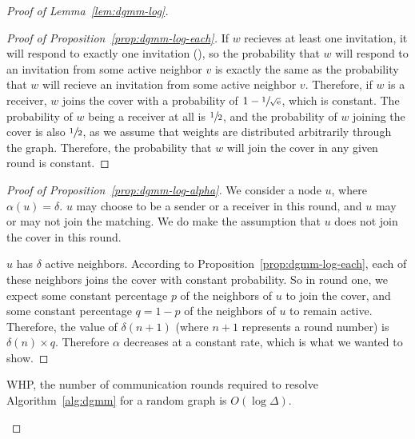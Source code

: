 \begin{proof}[Proof of Lemma~\ref{lem:dgmm-log}]
\begin{proof}[Proof of Proposition~\ref{prop:dgmm-log-each}]
If $w$ recieves at least one invitation, it will respond to exactly one invitation (), so the probability that $w$ will respond to an invitation from some active neighbor $v$ is exactly the same as the probability that $w$ will recieve an invitation from some active neighbor $v$. Therefore, if $w$ is a receiver, $w$ joins the cover with a probability of $1 - \sfrac{1}{\sqrt{{\mathrm{e}}}}$, which is constant. The probability of $w$ being a receiver at all is $\sfrac{1}{2}$, and the probability of $w$ joining the cover is also $\sfrac{1}{2}$, as we assume that weights are distributed arbitrarily through the graph. Therefore, the probability that $w$ will join the cover in any given round is constant.
\end{proof}

\begin{proof}[Proof of Proposition~\ref{prop:dgmm-log-alpha}]

We consider a node $u$, where $\alpha(u) = \delta$. $u$ may choose to be a sender or a receiver in this round, and $u$ may or may not join the matching. We do make the assumption that $u$ does not join the cover in this round.

$u$ has $\delta$ active neighbors. According to Proposition~\ref{prop:dgmm-log-each}, each of these neighbors joins the cover with constant probability. So in round one, we expect some constant percentage $p$ of the neighbors of $u$ to join the cover, and some constant percentage $q = 1-p$ of the neighbors of $u$ to remain active. Therefore, the value of $\delta(n+1)$ (where $n+1$ represents a round number) is $\delta(n) \times q$. Therefore $\alpha$ decreases at a constant rate, which is what we wanted to show.

\end{proof}

\begin{cor}WHP, the number of communication rounds required to resolve Algorithm~\ref{alg:dgmm} for a random graph is $O(\log\Delta)$.\end{cor}

\end{proof} 

